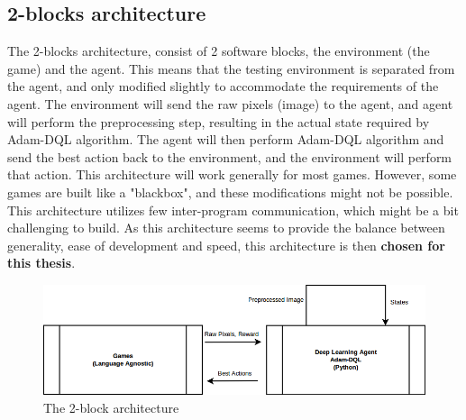     \subsection{2-blocks architecture}
        The 2-blocks architecture, consist of 2 software blocks, the environment (the game) and the agent. This means that the testing environment is separated from the agent, and only modified slightly to accommodate the requirements of the agent. The environment will send the raw pixels (image) to the agent, and agent will perform the preprocessing step, resulting in the actual state required by Adam-DQL algorithm. The agent will then perform Adam-DQL algorithm and send the best action back to the environment, and the environment will perform that action. This architecture will work generally for most games. However, some games are built like a "blackbox", and these modifications might not be possible. This architecture utilizes few inter-program communication, which might be a bit challenging to build. As this architecture seems to provide the balance between generality, ease of development and speed, this architecture is then \textbf{chosen for this thesis}.
        
           \begin{figure}[H]
            \centering
            \includegraphics[scale=0.4]{images/framework2block.png}
            \caption{The 2-block architecture}
            \label{fig:2block}
        \end{figure}
 
